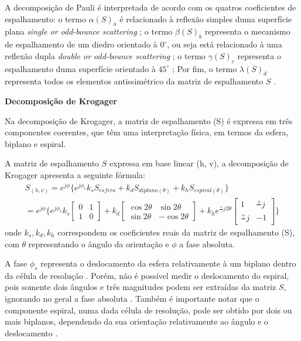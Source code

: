 \documentclass[a4paper,12pt]{article}
\begin{document}
A decomposição de Pauli é interpretada de acordo com os quatros coeficientes de espalhamento: o termo $\alpha (S)_{a}$ é relacionado à reflexão simples duma superfície plana \textit{single or odd-bounce scattering} \cite{jong:2009}; o termo $\beta (S)_{b}$ representa o mecanismo de espalhamento de um diedro orientado à $0^{\circ}$, ou seja está relacionado à uma reflexão dupla \textit{double or odd-bounce scattering} \cite{nilosergio2012}; o termo $\gamma (S)_{c}$ representa o espalhamento duma superfície orientado à $45^{\circ}$ \cite{jong:2009}; Por fim, o termo $\lambda (S)_{d}$ representa todos os elementos antissimétrico da matriz de espalhamento $S$ \cite{jong:2009}.

\textbf{Decomposição de Krogager}

Na decomposição de Krogager, a matriz de espalhamento (S) é expressa em três componentes coerentes, que têm uma interpretação física, em termos da esfera, biplano e espiral\cite{jong:2009}.

A matriz de espalhamento $S$ expressa em base linear (h, v), a decomposição de Krogager apresenta a seguinte fórmula:
\begin{multline}
    S_{(h, v)} = e^{j\phi} \{e^{j\phi_s}k_sS_{esfera}+k_dS_{diplano(\theta)}+k_hS_{espiral(\theta)}\} \\
    =e^{j\phi} \Big\{ e^{j\phi_s}k_s \begin{bmatrix}
    	0 & 1 \\
    	1 & 0
	\end{bmatrix}+k_d \begin{bmatrix}
    	\cos{2\theta} & \sin{2\theta} \\
    	\sin{2\theta} & -\cos{2\theta}
	\end{bmatrix}+k_he^{\frac{+}{-}j2\theta} \begin{bmatrix}
    	1 & \frac{+}{}j \\
    	\frac{+}{}j & -1
	\end{bmatrix} \Big\}
\end{multline}
onde $k_{s}, k_{d}, k_{h}$ correspondem os coeficientes reais da matriz de espalhamento (S), com $\theta$ representando o ângulo da orientação e $\phi$ a fase absoluta.

A fase $\phi_{s}$ representa o deslocamento da esfera relativamente à um biplano dentro da célula de resolução \cite{jong:2009}. Porém, não é possível medir o deslocamento do espiral, pois somente dois ângulos e três magnitudes podem ser extraídas da matriz $S$, ignorando no geral a fase absoluta \cite{jong:2009}. Também é importante notar que o componente espiral, numa dada célula de resolução, pode ser obtido por dois ou mais biplanos, dependendo da sua orientação relativamente ao ângulo e o deslocamento \cite{jong:2009}.
\end{document}
